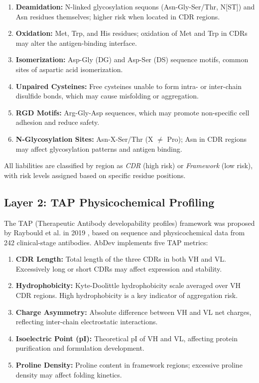 \documentclass[12pt,a4paper]{article}
\begin{document}
\begin{enumerate}
    \item \textbf{Deamidation:} N-linked glycosylation sequons (Asn-Gly-Ser/Thr, N{[}ST{]}) and Asn residues themselves; higher risk when located in CDR regions.
    \item \textbf{Oxidation:} Met, Trp, and His residues; oxidation of Met and Trp in CDRs may alter the antigen-binding interface.
    \item \textbf{Isomerization:} Asp-Gly (DG) and Asp-Ser (DS) sequence motifs, common sites of aspartic acid isomerization.
    \item \textbf{Unpaired Cysteines:} Free cysteines unable to form intra- or inter-chain disulfide bonds, which may cause misfolding or aggregation.
    \item \textbf{RGD Motifs:} Arg-Gly-Asp sequences, which may promote non-specific cell adhesion and reduce safety.
    \item \textbf{N-Glycosylation Sites:} Asn-X-Ser/Thr (X $\neq$ Pro); Asn in CDR regions may affect glycosylation patterns and antigen binding.
\end{enumerate}

All liabilities are classified by region as \textit{CDR} (high risk) or \textit{Framework} (low risk), with risk levels assigned based on specific residue positions.

\subsection{Layer 2: TAP Physicochemical Profiling}

The TAP (Therapeutic Antibody developability profiles) framework was proposed by Raybould et al. in 2019 \citep{Raybould2019}, based on sequence and physicochemical data from 242 clinical-stage antibodies. AbDev implements five TAP metrics:

\begin{enumerate}
    \item \textbf{CDR Length:} Total length of the three CDRs in both VH and VL. Excessively long or short CDRs may affect expression and stability.
    \item \textbf{Hydrophobicity:} Kyte-Doolittle hydrophobicity scale averaged over VH CDR regions. High hydrophobicity is a key indicator of aggregation risk.
    \item \textbf{Charge Asymmetry:} Absolute difference between VH and VL net charges, reflecting inter-chain electrostatic interactions.
    \item \textbf{Isoelectric Point (pI):} Theoretical pI of VH and VL, affecting protein purification and formulation development.
    \item \textbf{Proline Density:} Proline content in framework regions; excessive proline density may affect folding kinetics.
\end{enumerate}
\end{document}
